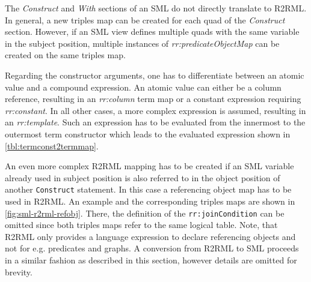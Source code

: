 
The \emph{Construct} and \emph{With} sections of an SML do not directly
translate to R2RML.
In general, a new triples map
can be created for each quad of the \emph{Construct} section.
However, if an SML view defines multiple quads with the same
variable in the subject position, multiple instances of
\emph{rr:predicate\-ObjectMap} can be created on the same triples map.


Regarding the constructor arguments, one has to differentiate between an atomic
value and a compound expression.
An atomic value can either be a column reference, resulting in an \emph{rr:column} term map or a constant expression requiring \emph{rr:constant}.
In all other cases, a more complex expression is assumed, resulting in an
\emph{rr:template}.
Such an expression has to be evaluated from the innermost to the outermost term constructor which leads to the evaluated expression shown in \autoref{tbl:termconst2termmap}.


An even more complex R2RML mapping has to be created if an SML variable already used in subject position is also referred to in the object position of another \texttt{Construct} statement.
In this case a referencing object map has to be used in R2RML.
An example and the corresponding triples maps are shown in \autoref{fig:sml-r2rml-refobj}.
%
There, the definition of the \texttt{rr:joinCondition} can be omitted since both triples maps refer to the same logical table.
Note, that R2RML only provides a language expression to declare referencing
objects and not for e.g. predicates and graphs.
A conversion from R2RML to SML proceeds in a similar fashion as described in
this section, however details are omitted for brevity.

